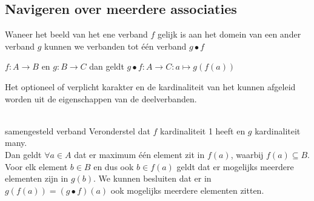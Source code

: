 \documentclass[../main.tex]{subfiles}
\begin{document}
\subsection{Navigeren over meerdere associaties}
Waneer het beeld van het ene verband $f$ gelijk is aan het domein van een ander verband $g$ kunnen we verbanden  tot \'e\'en verband $g \bullet f$
\begin{center}
$f:A \rightarrow B$ en $g:B \rightarrow C$ dan geldt $g \bullet f: A \rightarrow C: a \mapsto g(f(a))$
\end{center}
Het optioneel of verplicht karakter en de kardinaliteit van het  kunnen afgeleid worden uit de eigenschappen van de deelverbanden.\\\\
\noindent
\begin{ex}{samengesteld verband}
Veronderstel dat $f$ kardinaliteit 1 heeft en $g$ kardinaliteit many. \\
Dan geldt $\forall a \in A$ dat er maximum \'e\'en element zit in $f(a)$, waarbij $f(a) \subseteq B$. Voor elk element $b \in B$ en dus ook $b \in f(a)$ geldt dat er mogelijks meerdere elementen zijn in $g(b)$. We kunnen besluiten dat er in $g(f(a)) = (g \bullet f)(a)$ ook mogelijks meerdere elementen zitten.
\end{ex}
\end{document}
